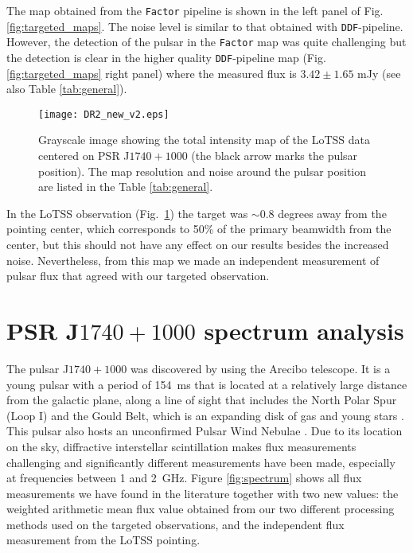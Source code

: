 \documentclass[manuscript]{aastex63}
\begin{document}
The map obtained from the \texttt{Factor} pipeline is shown in the left panel of Fig. \ref{fig:targeted_maps}. The noise level is similar to that obtained with \texttt{DDF}-pipeline. However, the detection of the pulsar in the \texttt{Factor} map was quite challenging but the detection is clear in the higher quality \texttt{DDF}-pipeline map (Fig. \ref{fig:targeted_maps} right panel) where the measured flux is $3.42 \pm 1.65$ mJy (see also Table \ref{tab:general}).   
  
\begin{figure}[ht!]
\centering
\texttt{[image: DR2\_new\_v2.eps]}
\caption{Grayscale image showing the total intensity map of the LoTSS data centered on PSR J$1740+1000$ (the black arrow marks the pulsar position). The map resolution and noise around the pulsar position are listed in the Table \ref{tab:general}.
\label{fig:ponting_maps}}
\end{figure}
 
In the LoTSS observation (Fig.~\ref{fig:ponting_maps}) the target was $\sim 0.8$ degrees away from the pointing center, which corresponds to 50\% of the primary beamwidth from the center, but this should not have any effect on our results besides the increased noise. Nevertheless, from this map we made an independent measurement of pulsar flux that agreed with our targeted observation.  

\section{PSR J$1740+1000$ spectrum analysis}\label{Sec4}

The pulsar J$1740+1000$ was discovered by \citealt{2000McLaughlin} using the Arecibo telescope. It is a young pulsar with a period of 154~ms that is located at a relatively large distance from the galactic plane, along a line of sight that includes the North Polar Spur (Loop I) and the Gould Belt, which is an expanding disk of gas and young stars \citep{2002McLaughlin}. This pulsar also hosts an unconfirmed Pulsar Wind Nebulae \citep{2008Kargaltsev,2010Kargaltsev}. Due to its location on the sky, diffractive interstellar scintillation makes flux measurements challenging and significantly different measurements have been made, especially at frequencies between 1 and 2~GHz. Figure \ref{fig:spectrum} shows all flux measurements we have found in the literature together with two new values: the weighted arithmetic mean flux value obtained from our two different processing methods used on the targeted observations, and the independent flux measurement from the LoTSS pointing.
\end{document}
